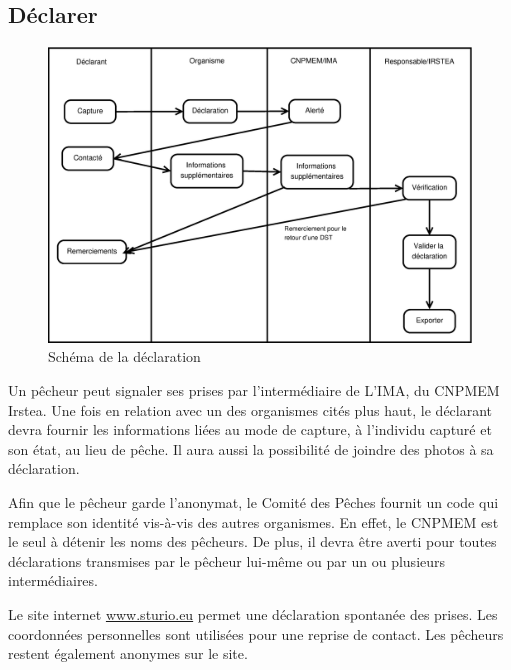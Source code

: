 \documentclass[12pt,a4paper]{article}
\begin{document}
\subsection{Déclarer}
\begin{figure}[h]
\centering
\includegraphics[width=\textwidth]{schemaDeclaration.eps}
\caption{Schéma de la déclaration}
\end{figure}
Un pêcheur peut signaler ses prises par l'intermédiaire de L'IMA, du CNPMEM Irstea. Une fois en relation avec un des organismes cités plus haut, le déclarant devra fournir les informations liées au mode de capture, à l'individu capturé et son état, au lieu de pêche. Il aura aussi la possibilité de joindre des photos à sa déclaration.

Afin que le pêcheur garde l'anonymat, le Comité des Pêches fournit un code qui remplace son identité vis-à-vis des autres organismes. En effet, le CNPMEM est le seul à détenir les noms des pêcheurs.  
De plus, il devra être averti pour toutes déclarations transmises par le pêcheur lui-même ou par un ou plusieurs intermédiaires.

Le site internet \url{www.sturio.eu} permet une déclaration spontanée des prises. Les coordonnées personnelles sont utilisées pour une reprise de contact. Les pêcheurs restent également anonymes sur le site.
\clearpage
\end{document}
